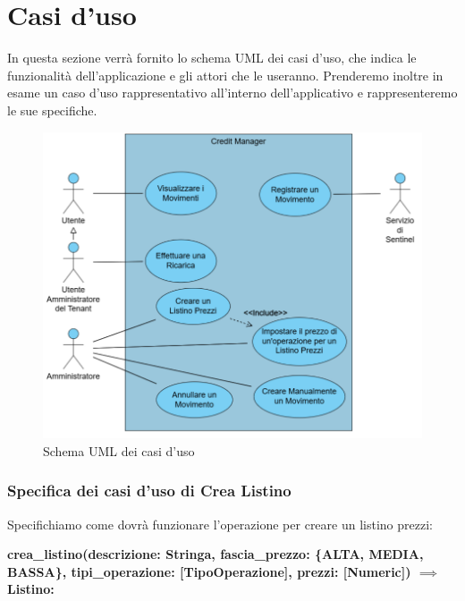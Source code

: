 \section{Casi d'uso}
In questa sezione verr\`a fornito lo schema UML dei casi d'uso, che indica le funzionalit\`a dell'applicazione e gli attori che le useranno. Prenderemo inoltre in esame
un caso d'uso rappresentativo all'interno dell'applicativo e rappresenteremo le sue specifiche.
\begin{figure}[H]
  \centering
  \includegraphics[width=13cm]{images/db-diagrams/use-case-diagram.jpg}
  \caption{Schema UML dei casi d'uso}
\end{figure}
\newpage
\subsubsection{Specifica dei casi d'uso di Crea Listino}
Specifichiamo come dovr\`a funzionare l'operazione per creare un listino prezzi:

\textbf{crea\_listino(descrizione: Stringa, fascia\_prezzo: \{ALTA, MEDIA,\\BASSA\}, tipi\_operazione: [TipoOperazione], prezzi: [Numeric]) $\implies$ Listino:}

